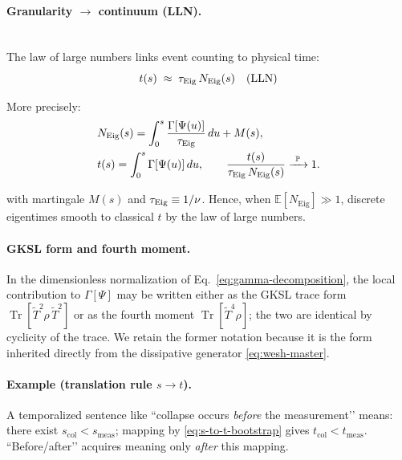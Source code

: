 \documentclass[12pt,a4paper]{article}
\renewcommand{\Tr}{\operatorname{Tr}}
\numberwithin{equation}{section}
\begin{document}
\vspace{0.5cm}

\paragraph{Granularity $\to$ continuum (LLN).}

\vspace{0.5cm}
~\\ 

\noindent The law of large numbers links event counting to physical time:
\begin{equation}
t(s) \;\approx\; \tau_{\rm Eig}\,N_{\rm Eig}(s) \quad\text{(LLN)}
\label{eq:countingtotime-relation}
\end{equation}

\noindent More precisely:
\begin{align}
&N_{\mathrm{Eig}}(s)=\int_0^s \frac{\Gamma[\Psi(u)]}{\tau_{\rm Eig}}\,du + M(s), \notag\\
&t(s)=\int_0^s \Gamma[\Psi(u)]\,du, \qquad
\frac{t(s)}{\tau_{\rm Eig}\,N_{\mathrm{Eig}}(s)} \xrightarrow{\ \mathbb{P}\ } 1. \notag
\end{align}

\vspace{0.5cm}

\noindent with martingale $M(s)$ and $\tau_{\rm Eig}\equiv 1/\nu$. Hence, when $\mathbb{E}[N_{\mathrm{Eig}}]\gg1$, discrete eigentimes smooth to classical $t$ by the law of large numbers.

\vspace{0.5cm}

\paragraph{GKSL form and fourth moment.}
In the dimensionless normalization of Eq.~\eqref{eq:gamma-decomposition},
the local contribution to $\Gamma[\Psi]$ may be written either as the GKSL
trace form $\Tr[\tilde T^{2}\rho\,\tilde T^{2}]$ or as the fourth moment
$\Tr[\tilde T^{4}\rho]$; the two are identical by cyclicity of the trace.
We retain the former notation because it is the form inherited directly
from the dissipative generator \eqref{eq:wesh-master}.

\vspace{0.5cm}

\paragraph{Example (translation rule $s\to t$).}
A temporalized sentence like “collapse occurs \emph{before} the measurement’’ means: there exist $s_{\mathrm{col}}<s_{\mathrm{meas}}$; mapping by \eqref{eq:s-to-t-bootstrap} gives $t_{\mathrm{col}}<t_{\mathrm{meas}}$. “Before/after’’ acquires meaning only \emph{after} this mapping.
\end{document}
